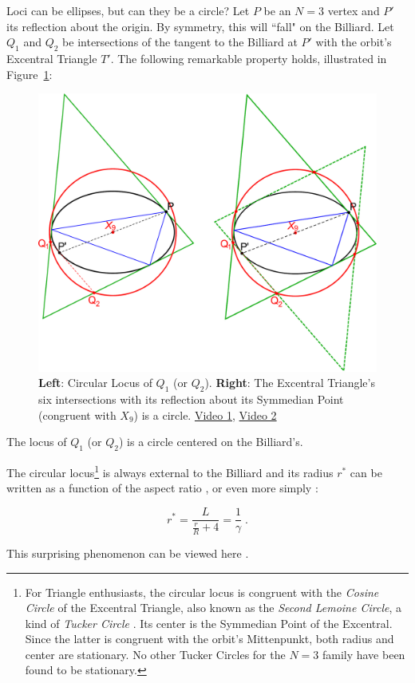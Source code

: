 Loci can be ellipses, but can they be a circle? Let $P$ be an $N=3$ vertex and $P'$ its reflection about the origin. By symmetry, this will ``fall" on the Billiard. Let  $Q_1$ and $Q_2$ be intersections of the tangent to the Billiard at $P'$ with the orbit's Excentral Triangle $T'$. The following remarkable property holds, illustrated in Figure~\ref{fig:cosine_circle_locus}: 

\begin{figure}[H]
\centering
\includegraphics[width=.8\linewidth]{pics/u0110_cosine_circle_locus.pdf}
\caption{\textbf{Left}: Circular Locus of $Q_1$ (or $Q_2$). \textbf{Right}: The Excentral Triangle's six intersections with its reflection about its Symmedian Point (congruent with $X_9$) is a circle. \href{https://youtu.be/CrOSI8d8qDc}{Video 1}, \href{https://youtu.be/hCQIT6_XhaQ}{Video 2} \cite[pl\#16,17]{dsr_math_intell_playlist}}
\label{fig:cosine_circle_locus}
\end{figure}

\begin{theorem}
The locus of $Q_1$ (or $Q_2$) is a circle centered on the Billiard's.
\end{theorem}

The circular locus\footnote{For Triangle enthusiasts, the circular locus is congruent with the {\em Cosine Circle} of the Excentral Triangle, also known as the {\em Second Lemoine Circle}, a kind of {\em Tucker Circle} \cite{mw}. Its center is the Symmedian Point of the Excentral. Since the latter is congruent with the orbit's Mittenpunkt, both radius and center are stationary. No other Tucker Circles for the $N=3$ family have been found to be stationary.} is always external to the Billiard and its radius $r^*$ can be written as a function of the aspect ratio \cite{ronaldo19a}, or even more simply \cite{dominique19,sergei19_private_circles}:

\begin{equation}
r^* = %
\frac{L}{\frac{r}{R}+4} = \frac{1}{\gamma}\;.
\label{eqn:rstar}
\end{equation}

This surprising phenomenon can be viewed here \cite[pl\#16,17]{dsr_math_intell_playlist}.
